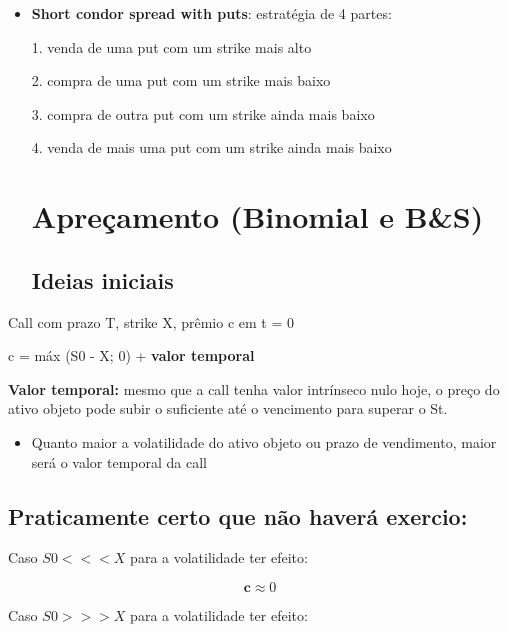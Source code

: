 \documentclass{sciposter}
\begin{document}
\begin{multicols}{3}
\begin{itemize}
2. compra de duas calls com strike mais alto 

3. venda de uma call com strike ainda mais alto. 
\item \textbf{Short condor spread with puts}: estratégia de 4 partes:

1. venda de uma put com um strike mais alto

2. compra de uma put com um strike mais baixo

3. compra de outra put com um strike ainda mais baixo 

4. venda de mais uma put com um strike ainda mais baixo


\section{\textbf{Apreçamento (Binomial e B\&S)}}
\subsection*{\textbf{Ideias iniciais}}

\end{itemize}

    \begin{center}
Call com prazo T, strike X, prêmio c em t = 0
    \end{center}
c = máx (S0 - X; 0) + \textbf{valor temporal}

\vspace{0.75 cm}
\textbf{Valor temporal:} mesmo que a call tenha valor intrínseco nulo hoje, o preço do ativo objeto pode subir o suficiente até o vencimento para superar o St.
\begin{itemize}
    \item Quanto maior a volatilidade do ativo objeto ou prazo de vendimento, maior será o valor temporal da call
\end{itemize}

\vspace{0.75 cm}
\subsection*{\textbf{Praticamente certo que não haverá exercio:}}
   \begin{center}
Caso  $S0 <<< X$ para a volatilidade ter efeito:
    \end{center}
\[\mathbf{c} \approx 0\]


       \begin{center}
Caso  $S0 >>> X$ para a volatilidade ter efeito:
    \end{center}



\end{multicols}
\end{document}
